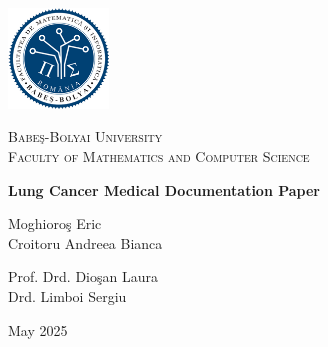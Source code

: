 \documentclass[a4paper,12pt]{article}
\begin{document}

\pagestyle{fancy}
\fancyhf{} %

\fancyhead[C]{\nouppercase{\leftmark}} %
\fancyfoot[C]{\thepage}                %

\renewcommand{\sectionmark}[1]{\markboth{#1}{}} %


\begin{titlepage}
    \centering

    \includegraphics[width=0.2\textwidth]{assets/ubb.png}\par\vspace{0.5cm} %

    {\scshape\large Babe\c{s}-Bolyai University\\Faculty of Mathematics and Computer Science\par}
    \vspace{2.0cm}

    {\huge\bfseries Lung Cancer Medical Documentation Paper\par}
    \vspace{2.0cm}

    {\Large Moghioro\c{s} Eric \\ Croitoru Andreea Bianca\par}
    \vspace{0.5cm}

    \vfill

    \noindent
    \begin{minipage}[t]{0.48\textwidth}
        \raggedright
        {\large Prof. Drd. Dio\c{s}an Laura \\ Drd. Limboi Sergiu}
    \end{minipage}%
    \hfill
    \begin{minipage}[t]{0.48\textwidth}
        \raggedleft
        {\large May 2025}
    \end{minipage}
\end{titlepage}
\end{document}
